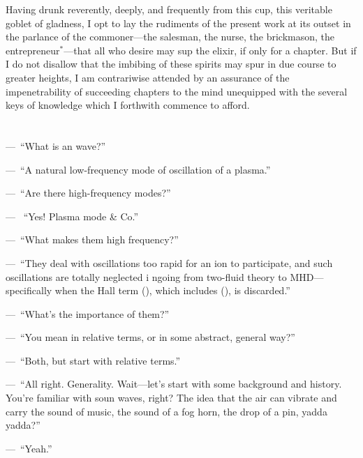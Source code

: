 Having drunk reverently, deeply, and frequently from this cup, this
veritable goblet of gladness, I opt to lay the rudiments of the
present work at its outset in the parlance of the commoner---the
salesman, the nurse, the brickmason, the entrepreneur$^*$---that all
who desire may sup the elixir, if only for a chapter. But if I do not
disallow that the imbibing of these spirits may spur in due course to
greater heights, I am contrariwise attended by an assurance of the
impenetrability of succeeding chapters to the mind unequipped with the
several keys of knowledge which I forthwith commence to afford.

\section{}

\newlength{\savedparindent}
\newlength{\savedparskip}
\setlength{\savedparindent}{\parindent}
\setlength{\savedparskip}{\parskip}

\setlength\parindent{0pt}
\setlength\parskip{1ex plus 2pt minus 1pt}
\newcommand\X{\par\noindent---~}


\X ``What is an \Alf wave?''  

\X ``A natural low-frequency mode of
oscillation of a plasma.''  

\X ``Are there high-frequency modes?''  

\X
``Yes! Plasma mode \& Co.''  

\X ``What makes them high frequency?''


\X ``They deal with oscillations too rapid for an ion to participate,
and such oscillations are totally neglected i ngoing from two-fluid
theory to MHD---specifically when the Hall term (), which includes (),
is discarded.''  

\X ``What's the importance of them?''  

\X ``You mean
in relative terms, or in some abstract, general way?''  

\X ``Both, but
start with relative terms.''  

\X ``All right. Generality. Wait---let's
start with some background and history. You're familiar with soun
waves, right? The idea that the air can vibrate and carry the sound of
music, the sound of a fog horn, the drop of a pin, yadda yadda?''

\X ``Yeah.''


